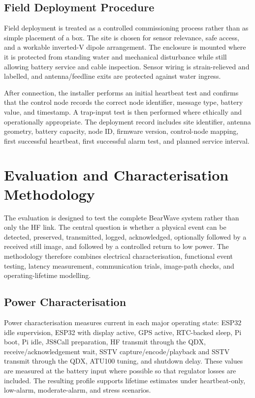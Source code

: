 \documentclass[acmsmall,screen]{acmart}
\begin{document}
\subsection{Field Deployment Procedure}
Field deployment is treated as a controlled commissioning process rather than as simple placement of a box. The site is chosen for sensor relevance, safe access, and a workable inverted-V dipole arrangement. The enclosure is mounted where it is protected from standing water and mechanical disturbance while still allowing battery service and cable inspection. Sensor wiring is strain-relieved and labelled, and antenna/feedline exits are protected against water ingress.

After connection, the installer performs an initial heartbeat test and confirms that the control node records the correct node identifier, message type, battery value, and timestamp. A trap-input test is then performed where ethically and operationally appropriate. The deployment record includes site identifier, antenna geometry, battery capacity, node ID, firmware version, control-node mapping, first successful heartbeat, first successful alarm test, and planned service interval.

\section{Evaluation and Characterisation Methodology}
The evaluation is designed to test the complete BearWave system rather than only the HF link. The central question is whether a physical event can be detected, preserved, transmitted, logged, acknowledged, optionally followed by a received still image, and followed by a controlled return to low power. The methodology therefore combines electrical characterisation, functional event testing, latency measurement, communication trials, image-path checks, and operating-lifetime modelling.

\subsection{Power Characterisation}
Power characterisation measures current in each major operating state: ESP32 idle supervision, ESP32 with display active, GPS active, RTC-backed sleep, Pi boot, Pi idle, JS8Call preparation, HF transmit through the QDX, receive/acknowledgement wait, SSTV capture/encode/playback and SSTV transmit through the QDX, ATU100 tuning, and shutdown delay. These values are measured at the battery input where possible so that regulator losses are included. The resulting profile supports lifetime estimates under heartbeat-only, low-alarm, moderate-alarm, and stress scenarios.
\end{document}
